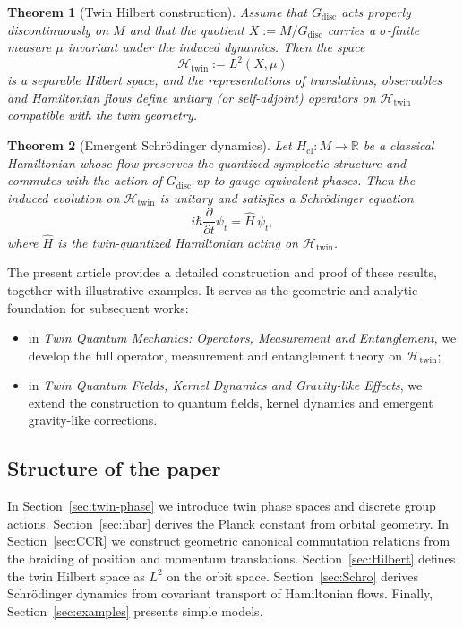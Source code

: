 \documentclass[11pt]{article}
\numberwithin{equation}{section}
\newtheorem{theorem}{Theorem}[section]
\theoremstyle{definition}
\theoremstyle{remark}
\newcommand{\R}{\mathbb{R}}
\newcommand{\Htw}{\mathcal{H}_{\mathrm{twin}}}
\newcommand{\Gdisc}{G_{\mathrm{disc}}}
\begin{document}
	\begin{theorem}[Twin Hilbert construction]\label{thm:intro-Hilbert}
		Assume that $\Gdisc$ acts properly discontinuously on $M$ and that the
		quotient $X:=M/\Gdisc$ carries a $\sigma$-finite measure $\mu$
		invariant under the induced dynamics. Then the space
		\[
		\Htw := L^2(X,\mu)
		\]
		is a separable Hilbert space, and the representations of translations,
		observables and Hamiltonian flows define unitary (or self-adjoint)
		operators on $\Htw$ compatible with the twin geometry.
	\end{theorem}
	
	\begin{theorem}[Emergent Schr\"odinger dynamics]\label{thm:intro-Schro}
		Let $H_{\mathrm{cl}}:M\to\R$ be a classical Hamiltonian whose flow
		preserves the quantized symplectic structure and commutes with the
		action of $\Gdisc$ up to gauge-equivalent phases. Then the induced
		evolution on $\Htw$ is unitary and satisfies a Schr\"odinger equation
		\[
		i\hbar \frac{\partial}{\partial t} \psi_t = \widehat{H}\, \psi_t,
		\]
		where $\widehat{H}$ is the twin-quantized Hamiltonian acting on
		$\Htw$.
	\end{theorem}
	
	The present article provides a detailed construction and proof of these
	results, together with illustrative examples. It serves as the
	geometric and analytic foundation for subsequent works:
	\begin{itemize}[leftmargin=2em]
		\item in \emph{Twin Quantum Mechanics: Operators, Measurement and
			Entanglement}, we develop the full operator, measurement and
		entanglement theory on $\Htw$;
		\item in \emph{Twin Quantum Fields, Kernel Dynamics and Gravity-like
			Effects}, we extend the construction to quantum fields, kernel
		dynamics and emergent gravity-like corrections.
	\end{itemize}
	
	\subsection*{Structure of the paper}
	
	In Section~\ref{sec:twin-phase} we introduce twin phase spaces and
	discrete group actions. Section~\ref{sec:hbar} derives the Planck
	constant from orbital geometry. In Section~\ref{sec:CCR} we construct
	geometric canonical commutation relations from the braiding of position
	and momentum translations. Section~\ref{sec:Hilbert} defines the twin
	Hilbert space as $L^2$ on the orbit space. Section~\ref{sec:Schro}
	derives Schr\"odinger dynamics from covariant transport of Hamiltonian
	flows. Finally, Section~\ref{sec:examples} presents simple models.
	
\end{document}
